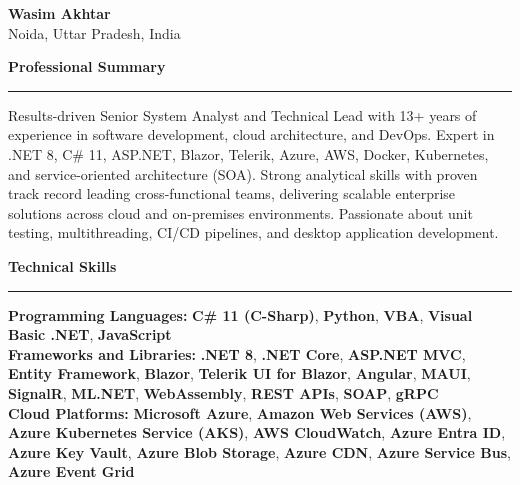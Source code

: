 \documentclass[10pt,a4paper]{article}
\newcommand{\sectionheader}[1]{%
    \vspace{8pt}
    {\large\bfseries #1}
    \vspace{2pt}
    \hrule
    \vspace{4pt}
}
\begin{document}

\begin{center}
    {\LARGE\bfseries Wasim Akhtar}\\[4pt]
    Noida, Uttar Pradesh, India
\end{center}

\vspace{2pt}


\sectionheader{Professional Summary}

Results-driven Senior System Analyst and Technical Lead with 13+ years of experience in software development, cloud architecture, and DevOps. Expert in .NET 8, C\# 11, ASP.NET, Blazor, Telerik, Azure, AWS, Docker, Kubernetes, and service-oriented architecture (SOA). Strong analytical skills with proven track record leading cross-functional teams, delivering scalable enterprise solutions across cloud and on-premises environments. Passionate about unit testing, multithreading, CI/CD pipelines, and desktop application development.


\sectionheader{Technical Skills}

\textbf{Programming Languages:} \textbf{C\# 11 (C-Sharp)}, \textbf{Python}, \textbf{VBA}, \textbf{Visual Basic .NET}, \textbf{JavaScript}\\[2pt]

\textbf{Frameworks and Libraries:} \textbf{.NET 8}, \textbf{.NET Core}, \textbf{ASP.NET MVC}, \textbf{Entity Framework}, \textbf{Blazor}, \textbf{Telerik UI for Blazor}, \textbf{Angular}, \textbf{MAUI}, \textbf{SignalR}, \textbf{ML.NET}, \textbf{WebAssembly}, \textbf{REST APIs}, \textbf{SOAP}, \textbf{gRPC}\\[2pt]

\textbf{Cloud Platforms:} \textbf{Microsoft Azure}, \textbf{Amazon Web Services (AWS)}, \textbf{Azure Kubernetes Service (AKS)}, \textbf{AWS CloudWatch}, \textbf{Azure Entra ID}, \textbf{Azure Key Vault}, \textbf{Azure Blob Storage}, \textbf{Azure CDN}, \textbf{Azure Service Bus}, \textbf{Azure Event Grid}\\[2pt]
\end{document}
